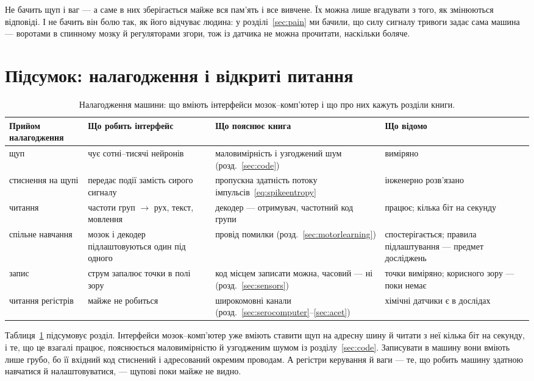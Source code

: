 Не бачить щуп і ваг --- а саме в них зберігається майже вся пам'ять і все вивчене. Їх можна лише вгадувати з того, як змінюються відповіді. І не бачить він болю так, як його відчуває людина: у розділі~\ref{sec:pain} ми бачили, що силу сигналу тривоги задає сама машина --- воротами в спинному мозку й регуляторами згори, тож із датчика не можна прочитати, наскільки боляче.

\section{Підсумок: налагодження і відкриті питання}

\begin{table}[t]
\centering
\footnotesize
\setlength{\tabcolsep}{4pt}
\renewcommand{\arraystretch}{1.15}
\begin{tabular}{>{\raggedright}p{2.2cm}>{\raggedright}p{3.6cm}>{\raggedright}p{3.4cm}>{\raggedright\arraybackslash}p{4.0cm}}
\toprule
Прийом налагодження & Що робить інтерфейс & Що пояснює книга & Що відомо \\
\midrule
щуп & чує сотні--тисячі нейронів & маловимірність і узгоджений шум (розд.~\ref{sec:code}) & виміряно \\
стиснення на щупі & передає події замість сирого сигналу & пропускна здатність потоку імпульсів~\eqref{eq:spikeentropy} & інженерно розв'язано \\
читання & частоти груп $\to$ рух, текст, мовлення & декодер --- отримувач, частотний код групи & працює; кілька біт на секунду \\
спільне навчання & мозок і декодер підлаштовуються один під одного & провід помилки (розд.~\ref{sec:motorlearning}) & спостерігається; правила підлаштування --- предмет досліджень \\
запис & струм запалює точки в полі зору & код місцем записати можна, часовий --- ні (розд.~\ref{sec:sensors}) & точки виміряно; корисного зору --- поки немає \\
читання регістрів & майже не робиться & широкомовні канали (розд.~\ref{sec:serocomputer}--\ref{sec:acet}) & хімічні датчики є в дослідах \\
\bottomrule
\end{tabular}
\caption{Налагодження машини: що вміють інтерфейси мозок--комп'ютер і що про них кажуть розділи книги.}
\label{tab:debugging}
\end{table}

Таблиця~\ref{tab:debugging} підсумовує розділ. Інтерфейси мозок--комп'ютер уже вміють ставити щуп на адресну шину й читати з неї кілька біт на секунду, і те, що це взагалі працює, пояснюється маловимірністю й узгодженим шумом із розділу~\ref{sec:code}. Записувати в машину вони вміють лише грубо, бо її вхідний код стиснений і адресований окремим проводам. А регістри керування й ваги --- те, що робить машину здатною навчатися й налаштовуватися, --- щупові поки майже не видно.

